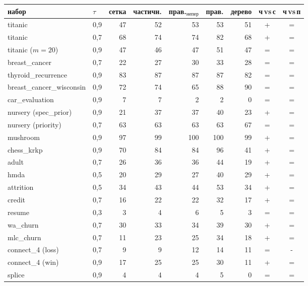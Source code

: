 \begin{tabular}{llrrrrrcc}
\toprule
набор & $\tau$ & сетка & частичн. & прав.$_{\mathrm{непер}}$ & прав. & дерево & ч$\,$vs$\,$с & ч$\,$vs$\,$п\\
\midrule
titanic & 0{,}9 & 47 & 52 & 53 & 53 & 51 & + & =\\
titanic & 0{,}7 & 68 & 74 & 74 & 82 & 68 & + & =\\
titanic ($m{=}20$) & 0{,}9 & 47 & 46 & 47 & 51 & 47 & = & =\\
breast\_cancer & 0{,}7 & 22 & 27 & 30 & 33 & 28 & = & =\\
thyroid\_recurrence & 0{,}9 & 83 & 87 & 87 & 87 & 82 & = & =\\
breast\_cancer\_wisconsin & 0{,}9 & 72 & 74 & 65 & 88 & 90 & = & =\\
car\_evaluation & 0{,}9 & 7 & 7 & 2 & 2 & 0 & = & =\\
nursery (spec\_prior) & 0{,}9 & 21 & 37 & 37 & 40 & 23 & + & =\\
nursery (priority) & 0{,}7 & 63 & 63 & 63 & 63 & 67 & = & =\\
mushroom & 0{,}9 & 97 & 99 & 100 & 100 & 99 & + & =\\
chess\_krkp & 0{,}9 & 70 & 84 & 84 & 96 & 41 & + & =\\
adult & 0{,}7 & 26 & 36 & 36 & 44 & 19 & + & =\\
hmda & 0{,}5 & 20 & 29 & 27 & 40 & 29 & + & =\\
attrition & 0{,}5 & 34 & 43 & 44 & 53 & 34 & + & =\\
credit & 0{,}7 & 16 & 22 & 22 & 32 & 17 & + & =\\
resume & 0{,}3 & 3 & 4 & 6 & 5 & 3 & = & =\\
wa\_churn & 0{,}7 & 30 & 33 & 34 & 39 & 30 & + & =\\
mlc\_churn & 0{,}7 & 11 & 23 & 25 & 34 & 18 & + & =\\
connect\_4 (loss) & 0{,}7 & 9 & 9 & 12 & 14 & 11 & = & -\\
connect\_4 (win) & 0{,}9 & 17 & 25 & 25 & 30 & 11 & + & =\\
splice & 0{,}9 & 4 & 4 & 4 & 5 & 0 & = & =\\
\bottomrule
\end{tabular}
